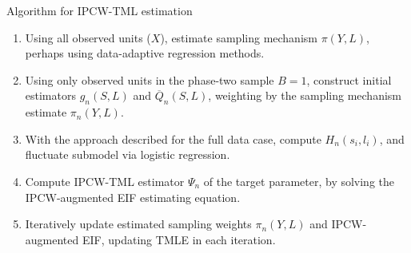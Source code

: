 \documentclass{beamer}
\begin{document}
\begin{frame}[c]{Algorithm for IPCW-TML estimation}

\begin{center}
\begin{enumerate}\label{ipcwtmle_algo}
  \itemsep8pt
  \item Using all observed units ($X$), estimate sampling mechanism
    $\pi(Y, L)$, perhaps using data-adaptive regression methods.
  \item Using only observed units in the phase-two sample $B = 1$,
    construct initial estimators $g_n(S,L)$ and $\overline{Q}_n(S,L)$,
    weighting by the sampling mechanism estimate $\pi_n(Y,L)$.
  \item With the approach described for the full data case, compute
    $H_n(s_i,l_i)$, and fluctuate submodel via logistic regression.
  \item Compute IPCW-TML estimator $\Psi_n$ of the target parameter, by solving
    the IPCW-augmented EIF estimating equation.
  \item Iteratively update estimated sampling weights $\pi_n(Y,L)$ and
    IPCW-augmented EIF, updating TMLE in each iteration.
\end{enumerate}
\end{center}


\end{frame}


\setbeamercovered{}
\beamerdefaultoverlayspecification{}

\begin{frame}[c,allowframebreaks]{}

\tiny



\end{frame}
\end{document}
